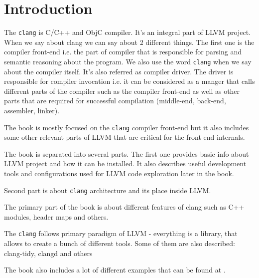 \chapter{Introduction}

The \texttt{clang} is C/C++ and ObjC compiler. It's an
integral part of LLVM 
project. When we say about clang we can say about 2 different
things. The first one is the compiler front-end i.e. the part of
compiler that is responsible for parsing and semantic reasoning about
the program. We also use the word \texttt{clang} when we say
about the compiler itself. It's also referred as compiler driver. The
driver is responsible for compiler invocation i.e. it can be
considered as a manger that calls different parts of the
compiler such as the compiler
front-end as well as other parts that are required for successful
compilation (middle-end, back-end, assembler, linker).

The book is mostly focused on the \texttt{clang} compiler
front-end but it also includes some other relevant parts of
LLVM that are critical for the front-end internals.

The book is separated into several parts. The first one provides basic
info about LLVM project and how it can be installed. It also describes
useful development tools and configurations used for LLVM code
exploration later in the book.

Second part is about \texttt{clang} architecture and its
place inside LLVM.

The primary part of the book is about different features of clang such as C++
modules, header maps and others.

The \texttt{clang} follows primary paradigm of LLVM -
everything is a library, that allows to create a bunch of different
tools. Some of them are also described: clang-tidy, clangd and others

The book also includes a lot of different examples that can be found at
\cite{github:clangbook_src}.
